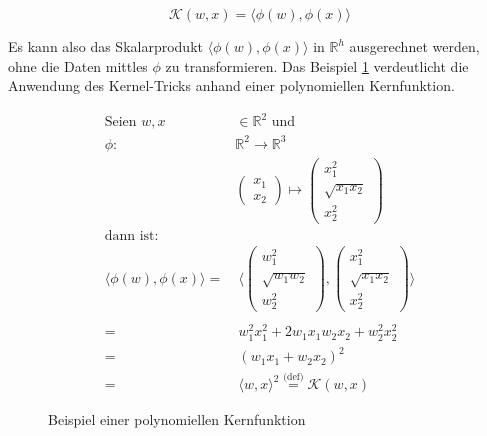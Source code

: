 \begin{equation}
\label{eq:svm_kern_trick}
    \mathcal{K}(w,x) = \langle\phi(w),\phi(x)\rangle
\end{equation}

Es kann also das Skalarprodukt $\langle\phi(w),\phi(x)\rangle$ in $\mathbb{R}^h$ ausgerechnet werden, ohne die Daten mittles $\phi$ zu transformieren. 
Das Beispiel \ref{fig:ex_kernel} verdeutlicht die Anwendung des Kernel-Tricks  anhand einer polynomiellen Kernfunktion.

\newpage

\renewcommand{\figurename}{Bsp.}
\begin{figure}[htbp]
\begin{equation*}
\label{eq:svm_kernel_example}
\begin{split}
    \text{Seien } w,x & \in \mathbb{R}^2 \text{ und}\\
    \phi : & \mathbb{R}^2 \to \mathbb{R}^3\\
    & \begin{pmatrix}
    x_1 \\
    x_2
    \end{pmatrix}
    \mapsto
    \begin{pmatrix}
    x_1^2 \\
    \sqrt{x_1x_2} \\
    x_2^2
    \end{pmatrix}\\
    \text{dann ist:} &\\
    \langle \phi(w),\phi(x) \rangle = & \:\langle \begin{pmatrix}
    w_1^2 \\
    \sqrt{w_1w_2} \\
    w_2^2
    \end{pmatrix},
    \begin{pmatrix}
    x_1^2 \\
    \sqrt{x_1x_2} \\
    x_2^2
    \end{pmatrix} \rangle \\
    \\
    = & \:w_1^2x_1^2 + 2 w_1x_1w_2x_2 + w_2^2x_2^2 \\
    = & \:(w_1x_1 + w_2x_2)^2 \\
    = & \:\langle w,x \rangle^2 \overset{\text{(def)}}= \mathcal{K}(w,x)
\end{split}
\end{equation*}
    \caption{Beispiel einer polynomiellen Kernfunktion}
    \label{fig:ex_kernel}
\end{figure}

